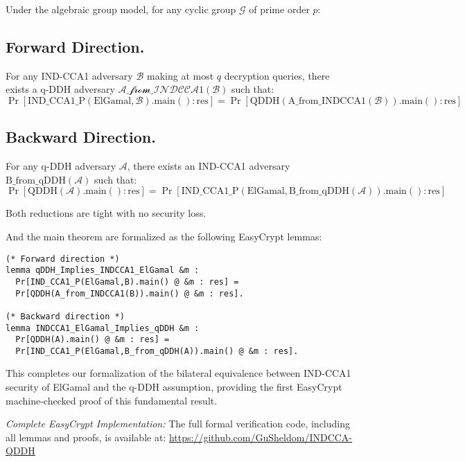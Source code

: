 \begin{theorem}
\label{thm:bilateral-equivalence}
Under the algebraic group model, for any cyclic group $\mathcal{G}$ of prime order $p$:

\subsection{Forward Direction.} For any IND-CCA1 adversary $\mathcal{B}$ making at most $q$ decryption queries, there exists a q-DDH adversary $\mathcal{\text{A\_from\_INDCCA1}}(\mathcal{B})$ such that:
\[
\Pr[\text{IND\_CCA1\_P}(\text{ElGamal}, \mathcal{B}).\text{main}() : \text{res}] = \Pr[\text{QDDH}({\text{A\_from\_INDCCA1}}(\mathcal{B})).\text{main}() : \text{res}]
\]

\subsection{Backward Direction.} For any q-DDH adversary $\mathcal{A}$, there exists an IND-CCA1 adversary ${\text{B\_from\_qDDH}}(\mathcal{A})$ such that:
\[
\Pr[\text{QDDH}(\mathcal{A}).\text{main}() : \text{res}] = \Pr[\text{IND\_CCA1\_P}(\text{ElGamal}, {\text{B\_from\_qDDH}}(\mathcal{A})).\text{main}() : \text{res}]
\]

Both reductions are tight with no security loss.
\end{theorem}


And the main theorem are formalized as the following EasyCrypt lemmas:

\begin{lstlisting}[style=easycrypt, caption=Main Bilateral Equivalence Lemmas, breaklines=true, breakatwhitespace=true, frame=single, keepspaces=true]
(* Forward direction *)
lemma qDDH_Implies_INDCCA1_ElGamal &m :
  Pr[IND_CCA1_P(ElGamal,B).main() @ &m : res] = 
  Pr[QDDH(A_from_INDCCA1(B)).main() @ &m : res].

(* Backward direction *)
lemma INDCCA1_ElGamal_Implies_qDDH &m :
  Pr[QDDH(A).main() @ &m : res] =
  Pr[IND_CCA1_P(ElGamal,B_from_qDDH(A)).main() @ &m : res].
\end{lstlisting}

This completes our formalization of the bilateral equivalence between IND-CCA1 security of ElGamal and the q-DDH assumption, providing the first EasyCrypt machine-checked proof of this fundamental result.



\noindent \textit{Complete EasyCrypt Implementation:} The full formal verification code, including all lemmas and proofs, is available at: \url{https://github.com/GuSheldom/INDCCA-QDDH}



